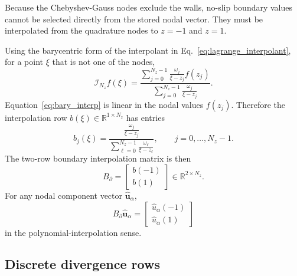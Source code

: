 \documentclass[11pt]{article}
\newcommand{\Bbdry}{B_{\partial}}
\begin{document}
Because the Chebyshev-Gauss nodes exclude the walls, no-slip boundary values
cannot be selected directly from the stored nodal vector. They must be
interpolated from the quadrature nodes to \(z=-1\) and \(z=1\).

Using the barycentric form of the interpolant in
Eq.~\eqref{eq:lagrange_interpolant}, for a point \(\xi\) that is not one of
the nodes,
\begin{equation}
  \mathcal{I}_{N_z}f(\xi)
  =
  \frac{\displaystyle
  \sum_{j=0}^{N_z-1}\frac{\omega_j}{\xi-z_j}f(z_j)}
  {\displaystyle
  \sum_{j=0}^{N_z-1}\frac{\omega_j}{\xi-z_j}}.
  \label{eq:bary_interp}
\end{equation}
Equation~\eqref{eq:bary_interp} is linear in the nodal values \(f(z_j)\).
Therefore the interpolation row \(b(\xi)\in\mathbb{R}^{1\times N_z}\) has
entries
\begin{equation}
  b_j(\xi)
  =
  \frac{\displaystyle\frac{\omega_j}{\xi-z_j}}
  {\displaystyle\sum_{\ell=0}^{N_z-1}\frac{\omega_\ell}{\xi-z_\ell}},
  \qquad j=0,\ldots,N_z-1.
  \label{eq:boundary_interp_row}
\end{equation}
The two-row boundary interpolation matrix is then
\begin{equation}
  \Bbdry =
  \begin{bmatrix}
    b(-1)\\
    b(1)
  \end{bmatrix}
  \in\mathbb{R}^{2\times N_z}.
  \label{eq:boundary_matrix}
\end{equation}
For any nodal component vector \(\widehat{\bm{u}}_\alpha\),
\[
  \Bbdry\widehat{\bm{u}}_\alpha
  =
  \begin{bmatrix}
    \widehat{u}_\alpha(-1)\\
    \widehat{u}_\alpha(1)
  \end{bmatrix}
\]
in the polynomial-interpolation sense.

\subsection{Discrete divergence rows}
\end{document}
